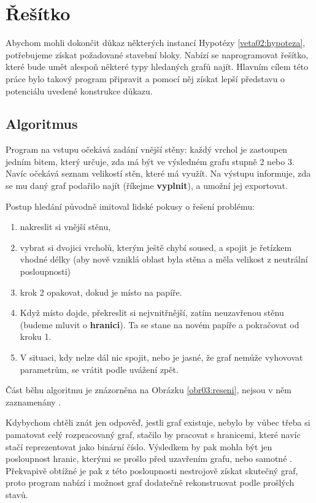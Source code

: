 
\chapter{Řešítko} \label{resitko}
Abychom mohli dokončit důkaz některých instancí Hypotézy \ref{veta02:hypoteza}, potřebujeme získat požadované stavební bloky. Nabízí se naprogramovat řešítko, které bude umět alespoň některé typy hledaných grafů najít. Hlavním cílem této práce bylo takový program připravit a pomocí něj získat lepší představu o potenciálu uvedené konstrukce důkazu.

\section{Algoritmus}

Program na vstupu očekává zadání vnější stěny: každý vrchol je zastoupen jedním bitem, který určuje, zda má být ve výsledném grafu stupně 2 nebo 3. Navíc očekává seznam velikostí stěn, které má využít. Na výstupu informuje, zda se mu daný graf podařilo najít (říkejme \textbf{vyplnit}), a umožní jej exportovat.

Postup hledání původně imitoval lidské pokusy o řešení problému: 

\begin{enumerate}
\item nakreslit si vnější stěnu,
\item vybrat si dvojici vrcholů, kterým ještě chybí soused, a spojit je řetízkem vhodné délky (aby nově vzniklá oblast byla stěna a měla velikost z neutrální posloupnosti)
\item krok 2 opakovat, dokud je místo na papíře.
\item Když místo dojde, překreslit si nejvnitřnější, zatím neuzavřenou stěnu (budeme mluvit o \textbf{hranici}). Ta se stane  na novém papíře a pokračovat od kroku 1.
\item V situaci, kdy nelze dál nic spojit, nebo je jasné, že graf nemůže vyhovovat parametrům, se vrátit podle uvážení zpět.
\end{enumerate}

Část běhu algoritmu je znázorněna na Obrázku \ref{obr03:reseni}, nejsou v něm zaznamenány .

Kdybychom chtěli znát jen  odpověď, jestli graf existuje, nebylo by vůbec třeba si pamatovat celý rozpracovaný graf, stačilo by pracovat s hranicemi, které navíc stačí reprezentovat jako binární číslo. Výsledkem by pak mohla být jen posloupnost hranic, kterými se prošlo před uzavřením grafu, nebo samotné . Překvapivě obtížné je pak z této posloupnosti nestrojově získat skutečný graf, proto program nabízí i možnost graf dodatečně rekonstruovat podle prošlých stavů.

